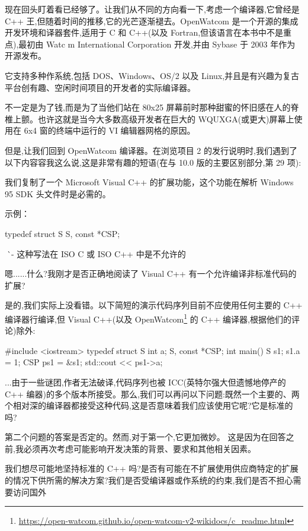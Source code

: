 现在回头盯着看已经够了。让我们从不同的方向看一下,考虑一个编译器,它曾经是 C++ 王,但随着时间的推移,它的光芒逐渐褪去。OpenWatcom 是一个开源的集成开发环境和译器套件,适用于 C 和 C++(以及 Fortran,但该语言在本书中不是重点),最初由 Watc m International Corporation 开发,并由 Sybase 于 2003 年作为开源发布。

它支持多种作系统,包括 DOS、Windows、OS/2 以及 Linux,并且是有兴趣为复古平台创有趣、空闲时间项目的开发者的实际编译器。

不一定是为了钱,而是为了当他们站在 80x25 屏幕前时那种甜蜜的怀旧感在人的脊椎上颤。也许这就是当今大多数高级开发者在巨大的 WQUXGA(或更大)屏幕上使用在 6x4 窗的终端中运行的 VI 编辑器网格的原因。

但是,让我们回到 OpenWatcom 编译器。在浏览项目 2 的发行说明时,我们遇到了以下内容容我这么说,这是非常有趣的短语(在与 10.0 版的主要区别部分,第 29 项):

\begin{shell}
我们复制了一个 Microsoft Visual C++ 的扩展功能，这个功能在解析 Windows 95 SDK 头文件时是必需的。

示例：

typedef struct S {
} S, const *CSP;

^^^^^ - 这种写法在 ISO C 或 ISO C++ 中是不允许的
\end{shell}

嗯......什么?我刚才是否正确地阅读了 Visual C++ 有一个允许编译非标准代码的扩展? 

是的,我们实际上没看错。以下简短的演示代码序列目前不应使用任何主要的 C++ 编译器行编译,但 Visual C++(以及 OpenWatcom\footnote{\url{https://open-watcom.github.io/open-watcom-v2-wikidocs/c_readme.html}} 的 C++ 编译器,根据他们的评论)除外:

\begin{cpp}
#include <iostream>
typedef struct S {
  int a;
} S, const *CSP;
int main() {
  S s1; s1.a = 1;
  CSP ps1 = &s1;
  std::cout << ps1->a;
}
\end{cpp}

...由于一些谜团,作者无法破译,代码序列也被 ICC(英特尔强大但遗憾地停产的 C++ 编器)的多个版本所接受。那么,我们可以再问以下问题:既然一个主要的、两个相对深的编译器都接受这种代码,这是否意味着我们应该使用它呢?它是标准的吗? 

第二个问题的答案是否定的。然而,对于第一个,它更加微妙。 这是因为在回答之前,我必须再次考虑可能影响开发决策的背景、要求和其他相关因素。

我们想尽可能地坚持标准的 C++ 吗?是否有可能在不扩展使用供应商特定的扩展的情况下供所需的解决方案?我们是否受编译器或作系统的约束,我们是否不担心需要访问国外

